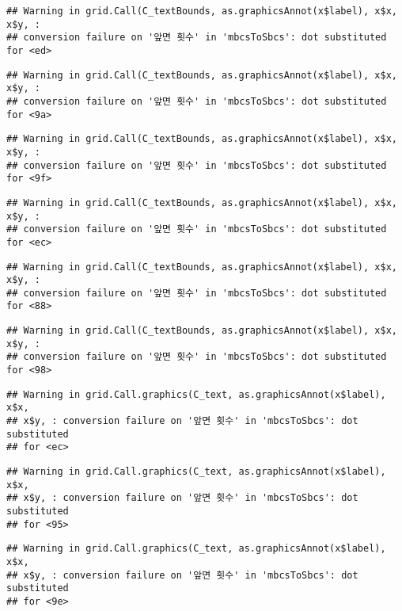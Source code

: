 \documentclass[]{book}
\begin{document}
\begin{verbatim}
## Warning in grid.Call(C_textBounds, as.graphicsAnnot(x$label), x$x, x$y, :
## conversion failure on '앞면 횟수' in 'mbcsToSbcs': dot substituted for <ed>
\end{verbatim}

\begin{verbatim}
## Warning in grid.Call(C_textBounds, as.graphicsAnnot(x$label), x$x, x$y, :
## conversion failure on '앞면 횟수' in 'mbcsToSbcs': dot substituted for <9a>
\end{verbatim}

\begin{verbatim}
## Warning in grid.Call(C_textBounds, as.graphicsAnnot(x$label), x$x, x$y, :
## conversion failure on '앞면 횟수' in 'mbcsToSbcs': dot substituted for <9f>
\end{verbatim}

\begin{verbatim}
## Warning in grid.Call(C_textBounds, as.graphicsAnnot(x$label), x$x, x$y, :
## conversion failure on '앞면 횟수' in 'mbcsToSbcs': dot substituted for <ec>
\end{verbatim}

\begin{verbatim}
## Warning in grid.Call(C_textBounds, as.graphicsAnnot(x$label), x$x, x$y, :
## conversion failure on '앞면 횟수' in 'mbcsToSbcs': dot substituted for <88>
\end{verbatim}

\begin{verbatim}
## Warning in grid.Call(C_textBounds, as.graphicsAnnot(x$label), x$x, x$y, :
## conversion failure on '앞면 횟수' in 'mbcsToSbcs': dot substituted for <98>
\end{verbatim}

\begin{verbatim}
## Warning in grid.Call.graphics(C_text, as.graphicsAnnot(x$label), x$x,
## x$y, : conversion failure on '앞면 횟수' in 'mbcsToSbcs': dot substituted
## for <ec>
\end{verbatim}

\begin{verbatim}
## Warning in grid.Call.graphics(C_text, as.graphicsAnnot(x$label), x$x,
## x$y, : conversion failure on '앞면 횟수' in 'mbcsToSbcs': dot substituted
## for <95>
\end{verbatim}

\begin{verbatim}
## Warning in grid.Call.graphics(C_text, as.graphicsAnnot(x$label), x$x,
## x$y, : conversion failure on '앞면 횟수' in 'mbcsToSbcs': dot substituted
## for <9e>
\end{verbatim}
\end{document}
